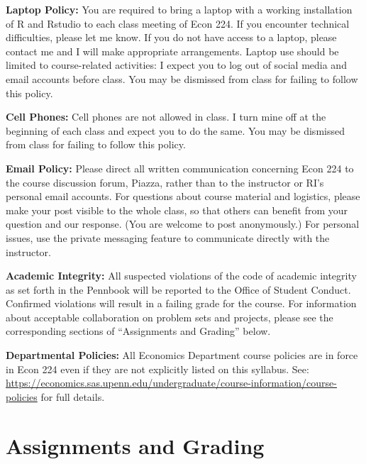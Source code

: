 \documentclass[11pt, letterpaper]{article}
\begin{document}
\medskip

\noindent \textbf{Laptop Policy:} You are required to bring a laptop with a working installation of R and Rstudio to each class meeting of Econ 224.
If you encounter technical difficulties, please let me know.
If you do not have access to a laptop, please contact me and I will make appropriate arrangements.
Laptop use should be limited to course-related activities: I expect you to log out of social media and email accounts before class.
You may be dismissed from class for failing to follow this policy.

\medskip

\noindent \textbf{Cell Phones:} Cell phones are not allowed in class. 
I turn mine off at the beginning of each class and expect you to do the same.
You may be dismissed from class for failing to follow this policy.

\medskip

\noindent \textbf{Email Policy:}
Please direct all written communication concerning Econ 224 to the course discussion forum, Piazza, rather than to the instructor or RI's personal email accounts.
For questions about course material and logistics, please make your post visible to the whole class, so that others can benefit from your question and our response.
(You are welcome to post anonymously.)
For personal issues, use the private messaging feature to communicate directly with the instructor. 

\medskip

\noindent \textbf{Academic Integrity:} 
All suspected violations of the code of academic integrity as set forth in the Pennbook will be reported to the Office of Student Conduct. 
Confirmed violations will result in a failing grade for the course. 
For information about acceptable collaboration on problem sets and projects, please see the corresponding sections of ``Assignments and Grading'' below.

\medskip

\noindent \textbf{Departmental Policies: } 
All Economics Department course policies are in force in Econ 224 even if they are not explicitly listed on this syllabus. 
See: \url{https://economics.sas.upenn.edu/undergraduate/course-information/course-policies} for full details.

\medskip



\newpage

\section*{Assignments and Grading}
\end{document}

